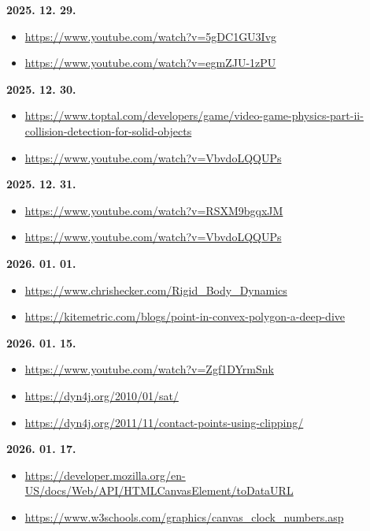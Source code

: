 \documentclass[12pt]{report}
\begin{document}
\noindent\textbf{2025. 12. 29.}
\begin{itemize}[left=0pt, topsep=0pt]
    \item \url{https://www.youtube.com/watch?v=5gDC1GU3Ivg}
    \item \url{https://www.youtube.com/watch?v=egmZJU-1zPU}
\end{itemize}

\noindent\textbf{2025. 12. 30.}
\begin{itemize}[left=0pt, topsep=0pt]
    \item \url{https://www.toptal.com/developers/game/video-game-physics-part-ii-collision-detection-for-solid-objects}
    \item \url{https://www.youtube.com/watch?v=VbvdoLQQUPs}
\end{itemize}

\noindent\textbf{2025. 12. 31.}
\begin{itemize}[left=0pt, topsep=0pt]
    \item \url{https://www.youtube.com/watch?v=RSXM9bgqxJM}
    \item \url{https://www.youtube.com/watch?v=VbvdoLQQUPs}
\end{itemize}

\noindent\textbf{2026. 01. 01.}
\begin{itemize}[left=0pt, topsep=0pt]
    \item \url{https://www.chrishecker.com/Rigid_Body_Dynamics}
    \item \url{https://kitemetric.com/blogs/point-in-convex-polygon-a-deep-dive}
\end{itemize}

\noindent\textbf{2026. 01. 15.}
\begin{itemize}[left=0pt, topsep=0pt]
    \item \url{https://www.youtube.com/watch?v=Zgf1DYrmSnk}
    \item \url{https://dyn4j.org/2010/01/sat/}
    \item \url{https://dyn4j.org/2011/11/contact-points-using-clipping/}
\end{itemize}

\noindent\textbf{2026. 01. 17.}
\begin{itemize}[left=0pt, topsep=0pt]
    \item \url{https://developer.mozilla.org/en-US/docs/Web/API/HTMLCanvasElement/toDataURL}
    \item \url{https://www.w3schools.com/graphics/canvas_clock_numbers.asp}
\end{itemize}
\end{document}
